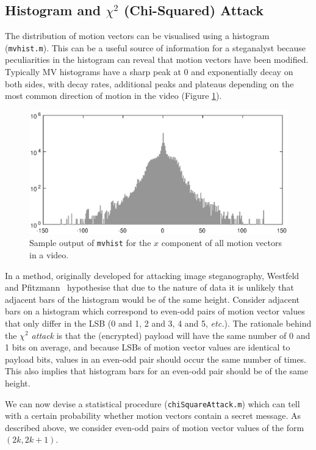 \documentclass[12pt,british,twoside,notitlepage,usenames,dvipsnames,hypens,final]{report}
\numberwithin{equation}{section}
\numberwithin{figure}{section}
\begin{document}
\subsection{Histogram and $\chi^2$ (Chi-Squared) Attack}

The distribution of motion vectors can be visualised using a histogram (\texttt{mvhist.m}). This can be a useful source of information for a steganalyst because peculiarities in the histogram can reveal that motion vectors have been modified. Typically MV histograms have a sharp peak at 0 and exponentially decay on both sides, with decay rates, additional peaks and plateaus depending on the most common direction of motion in the video (Figure \ref{fig:histogram-example}). 

\begin{figure}[tbh]
\centerline{\includegraphics[scale=0.75]{img/histogram-example.eps}}
\caption{Sample output of \texttt{mvhist} for the $x$ component of all motion vectors in a video.}
\label{fig:histogram-example}
\end{figure}

In a method, originally developed for attacking image steganography, Westfeld and Pfitzmann~\cite{westfeld1999attacks} hypothesise that due to the nature of data it is  unlikely that adjacent bars of the histogram would be of the same height. Consider adjacent bars on a histogram which correspond to even-odd pairs of motion vector values that only differ in the LSB (0 and 1, 2 and 3, 4 and 5, \emph{etc.}). The rationale behind the \emph{$\chi^2$ attack} is that the (encrypted) payload will have the same number of 0 and 1 bits on average, and  because LSBs of motion vector values are identical to payload bits, values in an even-odd pair should occur the same number of times. This also implies that histogram bars for an even-odd pair should be of the same height. 

We can now devise a statistical procedure (\texttt{chiSquareAttack.m}) which can tell with a certain probability whether motion vectors contain a secret message. As described above, we consider even-odd pairs of motion vector values of the form $(2k, 2k+1)$. 
\end{document}
